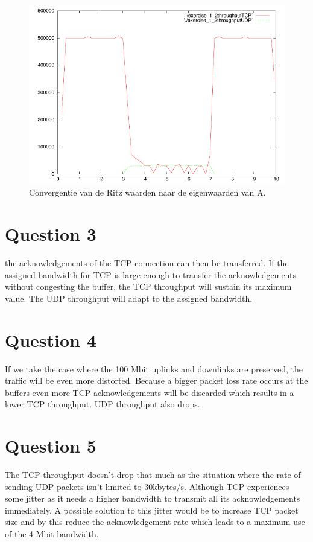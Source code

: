 \documentclass[a4paper]{report}
\newcommand{\opgave}[1]{\section{Question #1}}
\begin{document}
\begin{figure}[htb]
\centerline{\includegraphics{Exercise1/Question2/exercise_1_2plot.pdf}}
\caption{Convergentie van de Ritz waarden naar de eigenwaarden van A.}
\label{fig:figure2}
\end{figure}

\opgave{3}
the acknowledgements of the TCP connection can then be transferred. If the assigned bandwidth for TCP is large enough to transfer the acknowledgements without congesting the buffer, the TCP throughput will sustain its maximum value. The UDP throughput will adapt to the assigned bandwidth.  

\opgave{4}
If we take the case where the 100 Mbit uplinks and downlinks are preserved, the traffic will be even more distorted. Because a bigger packet loss rate occurs at the buffers even more TCP acknowledgements will be discarded which results in a lower TCP throughput. UDP throughput also drops. 

\opgave{5}
The TCP throughput doesn't drop that much as the situation where the rate of sending UDP packets isn't limited to 30kbytes/s. Although TCP experiences some jitter as it needs a higher bandwidth to transmit all its acknowledgements immediately. A possible solution to this jitter would be to increase TCP packet size and by this reduce the acknowledgement rate which leads to a maximum use of the 4 Mbit bandwidth.
\end{document}
